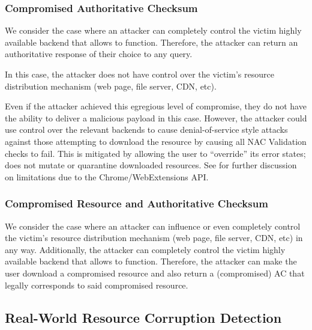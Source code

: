 \subsubsection{Compromised Authoritative Checksum}

We consider the case where an attacker can completely control the victim highly
available backend that allows \SYSTEM{} to function. Therefore, the attacker can
return an authoritative response of their choice to any query.

In this case, the attacker does not have control over the victim's resource
distribution mechanism (web page, file server, CDN, etc).

Even if the attacker achieved this egregious level of compromise, they do not
have the ability to deliver a malicious payload in this case. However, the
attacker could use control over the relevant backends to cause denial-of-service
style attacks against those attempting to download the resource by causing all
NAC Validation checks to fail. This is mitigated by \SYSTEM{} allowing the user
to ``override'' its error states; \ie \SYSTEM{} does not mutate or quarantine
downloaded resources. See  for further discussion on
limitations due to the Chrome/WebExtensions API.

\subsubsection{Compromised Resource and Authoritative Checksum}

We consider the case where an attacker can influence or even completely control
the victim's resource distribution mechanism (web page, file server, CDN, etc)
in any way. Additionally, the attacker can completely control the victim highly
available backend that allows \SYSTEM{} to function. Therefore, the attacker can
make the user download a compromised resource and also return a (compromised) AC
that legally corresponds to said compromised resource.

\subsection{Real-World Resource Corruption Detection}


